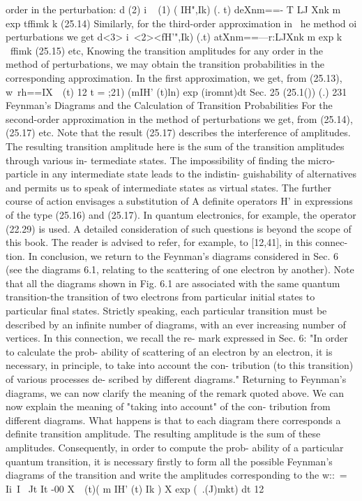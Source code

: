 \documentclass[a4paper,sfsidenotes,colorlinks=true]{tufte-book}
\numberwithin{equation}{section}
\numberwithin{figure}{section}
\begin{document}
{{{{{{order in the perturbation:
d (2)	i ~ (1) (	IH",Ik) (. t) deXnm==- T LJ Xnk m	exp tffimk 
k
(25.14) Similarly, for the third-order approximation in ~he method
oi perturbations we get d<3>	i~<2><fH'",Ik) (.t)
atXnm==---r:LJXnk m	exp k
~ffimk
(25.15)
etc, Knowing the transition amplitudes for any order in the method of perturbations, we may obtain the transition probabilities in the corresponding approximation. In the first approximation, we get, from (25.13),
w~rh==IX~~(t) 12 t
= ;21) (mIH' (t)ln)	exp	(iromnt)dt Sec. 25
(25.1())
(.)
231
Feynman's Diagrams and the Calculation of Transition Probabilities
For the second-order approximation in the method of perturbations we get, from (25.14),
(25.17)
etc. Note that the result (25.17) describes the interference of amplitudes. The resulting transition amplitude here is the sum of the transition amplitudes through various in- termediate states. The impossibility of finding the micro- particle in any intermediate state leads to the indistin- guishability of alternatives and permits us to speak of intermediate states as virtual states. The further course of action envisages a substitution of
A definite operators H' in expressions of the type (25.16)
and (25.17). In quantum electronics, for example, the operator (22.29) is used. A detailed consideration of such questions is beyond the scope of this book. The reader is advised to refer, for example, to [12,41], in this connec- tion.
In conclusion, we return to the Feynman's diagrams considered in Sec. 6 (see the diagrams 6.1, relating to the scattering of one electron by another). Note that all the diagrams shown in Fig. 6.1 are associated with the same quantum transition-the transition of two electrons from particular initial states to particular final states. Strictly speaking, each particular transition must be described by an infinite number of diagrams, with an ever increasing number of vertices. In this connection, we recall the re- mark expressed in Sec. 6: "In order to calculate the prob- ability of scattering of an electron by an electron, it is necessary, in principle, to take into account the con- tribution (to this transition) of various processes de- scribed by different diagrams."
Returning to Feynman's diagrams, we can now clarify the meaning of the remark quoted above. We can now explain the meaning of "taking into account" of the con- tribution from different diagrams. What happens is that to each diagram there corresponds a definite transition amplitude. The resulting amplitude is the sum of these amplitudes. Consequently, in order to compute the prob- ability of a particular quantum transition, it is necessary firstly to form all the possible Feynman's diagrams of the transition and write the amplitudes corresponding to the
w::~= Ii\ I~ Jt It -00
X~~(t)( m IH' (t) Ik ) X exp (~.(J)mkt) dt 12

}}}}}}
\end{document}
